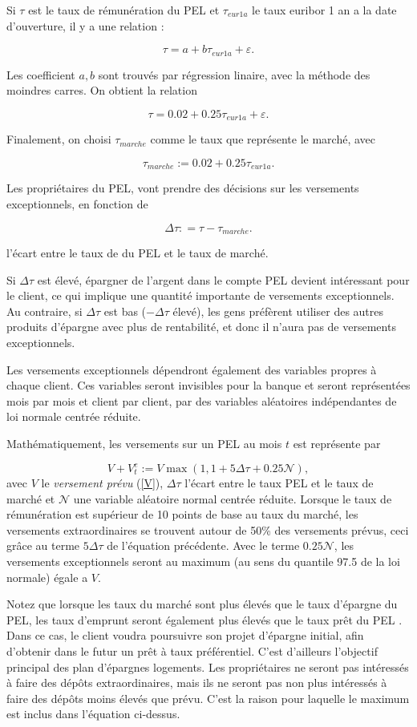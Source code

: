 \documentclass[12pt, a4paper]{book}
\begin{document}
Si $\tau$ est le taux de rémunération du PEL et $\tau_{eur1a}$ le taux euribor 1 an a la date d'ouverture, il  y a une relation :

$$ \tau = a + b \tau_{eur1a} +\varepsilon.$$ 

Les coefficient $a,b$ sont trouvés par régression linaire, avec la méthode des moindres carres. On obtient la relation

$$ \tau = 0.02 + 0.25 \tau_{eur1a} +\varepsilon.$$ 

Finalement, on choisi $\tau_{marche}$ comme le taux que représente le marché, avec

$$\tau_{marche} :=  0.02 + 0.25 \tau_{eur1a}.$$

Les propriétaires du PEL, vont prendre des décisions sur les versements exceptionnels, en fonction de

$$\Delta \tau : =\tau - \tau_{marche}.$$

l'écart entre le taux de  du PEL et le taux de marché.

Si $\Delta \tau$ est élevé, épargner de l'argent dans le compte PEL devient intéressant pour le client, ce qui implique une quantité importante de versements exceptionnels.  Au contraire, si $\Delta \tau$ est bas ($-\Delta \tau$ élevé), les gens préfèrent utiliser des autres produits d'épargne avec plus de rentabilité, et donc il n'aura pas de versements exceptionnels. 

Les versements exceptionnels dépendront également des variables propres à chaque client. Ces variables seront invisibles pour la banque et seront représentées mois par mois et client par client, par des variables aléatoires indépendantes de loi normale centrée réduite. 

Mathématiquement, les versements sur un PEL au mois $t$ est représente par 

$$V+V_t^e := V\max(1, 1+5\Delta \tau + 0.25 \mathcal{N}),$$
avec $V$ le {\it versement prévu} (\ref{V}), $\Delta \tau$ l'écart entre le taux PEL et le taux de marché et $\mathcal{N}$ une variable aléatoire normal centrée réduite. Lorsque le taux de rémunération est supérieur de 10 points de base au taux du marché, les versements extraordinaires se trouvent autour de 50\% des versements prévus, ceci grâce au terme $5\Delta \tau$ de l'équation précédente. Avec le terme $0.25 \mathcal{N}$, les versements exceptionnels seront au maximum (au sens du quantile 97.5 de la loi normale) égale a $V$.
 
Notez que lorsque les taux du marché sont plus élevés que le taux d'épargne du PEL, les taux d'emprunt seront également plus élevés que le taux prêt du PEL . Dans ce cas, le client voudra poursuivre son projet d'épargne initial, afin d'obtenir dans le futur un prêt à taux préférentiel. C'est d'ailleurs l'objectif principal des plan d'épargnes logements. Les propriétaires ne seront pas intéressés à faire des dépôts extraordinaires, mais ils ne seront pas non plus intéressés à faire des dépôts moins élevés que prévu. C'est la raison pour laquelle le maximum est inclus dans l'équation ci-dessus.
\end{document}

